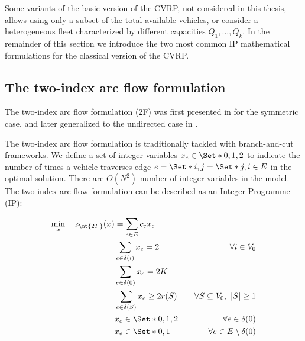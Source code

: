\medskip

Some variants of the basic version of the CVRP, not considered in this thesis, allows using only a subset of the total available vehicles,
or consider a heterogeneous fleet characterized by different capacities $Q_1, \dots, Q_k$.
In the remainder of this section we introduce the two most common IP mathematical formulations for the classical version of the CVRP.

\subsection{The two-index arc flow formulation}
\label{sec:intro-cvrp-two-index-flow-formulation}

The two-index arc flow formulation (2F) was first presented in \cite{laporte1983, laporte1985} for the symmetric case,
and later generalized to the undirected case in \cite{laporte1986}.

The two-index arc flow formulation is traditionally tackled with branch-and-cut frameworks.
We define a set of integer variables $x_e \in \Set*{0, 1, 2}$ to indicate the number of times
a vehicle traverses edge $e = \Set*{i, j} = \Set*{j, i} \in E$ in the optimal solution.
There are $O(N^2)$ number of integer variables in the model.
The two-index arc flow formulation can be described as an Integer Programme (IP):

\begin{align}
	\min_{x} \quad z_\mt{2F}(x) & = \sum_{e \in E} c_e x_e \label{eq:two-index-flow-obj-func}                                                                                        \\
	                            & \sum_{e \in \delta(i)} x_e = 2                              & \quad \forall i \in V_0 \label{eq:two-index-flow-two-edges-incident-per-customer}    \\
	                            & \sum_{e \in \delta(0)} x_e = 2 K                            & \label{eq:two-index-flow-two-k-edges-incident-in-the-depot-node}                     \\
	                            & \sum_{e \in \delta(S)} x_e \ge 2 r(S)                       & \quad \forall S \subseteq V_0,\ |S| \ge 1 \label{eq:two-index-flow-ccc}              \\
	                            & x_e                   \in \Set*{0, 1, 2}                    & \quad \forall e \in \delta(0) \label{eq:two-index-flow-x-mip-var-bounds-depot}       \\
	                            & x_e                   \in \Set*{0, 1}                       & \quad \forall e \in E \setminus \delta(0) \label{eq:two-index-flow-x-mip-var-bounds}
\end{align}

